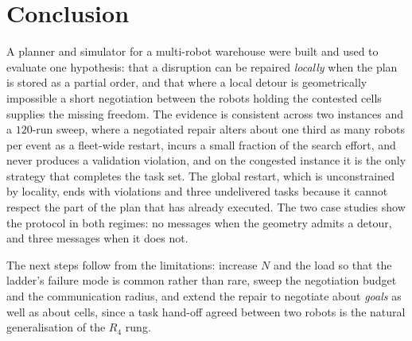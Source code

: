 \documentclass[10pt,a4paper]{article}
\begin{document}
\section{Conclusion}

A planner and simulator for a multi-robot warehouse were built and used to
evaluate one hypothesis: that a disruption can be repaired \emph{locally}
when the plan is stored as a partial order, and that where a local detour is
geometrically impossible a short negotiation between the robots holding the
contested cells supplies the missing freedom.  The evidence is consistent
across two instances and a $120$-run sweep, where a negotiated repair alters
about one third as many robots per event as a fleet-wide restart, incurs a
small fraction of the search effort, and never produces a validation
violation, and on the congested instance it is the only strategy that
completes the task set.  The global restart, which is unconstrained by
locality, ends with violations and three undelivered tasks because it cannot
respect the part of the plan that has already executed.  The two case studies
show the protocol in both regimes: no messages when the geometry admits a
detour, and three messages when it does not.

The next steps follow from the limitations: increase $N$ and the load so that
the ladder's failure mode is common rather than rare, sweep the negotiation
budget and the communication radius, and extend the repair to negotiate about
\emph{goals} as well as about cells, since a task hand-off agreed between two
robots is the natural generalisation of the $R_4$ rung.
\end{document}
